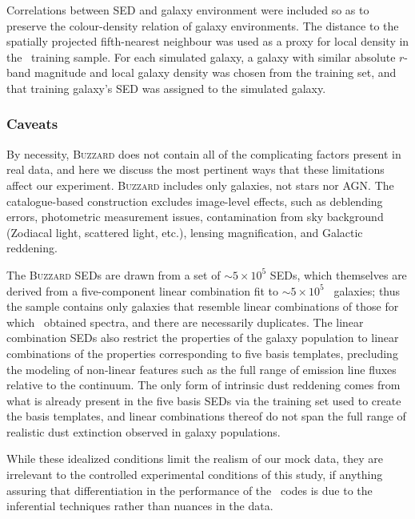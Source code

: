 Correlations between SED and galaxy environment were included so as to preserve the colour-density relation of galaxy environments.
The distance to the spatially projected fifth-nearest neighbour was used as a proxy for local density in the \sdss\ training sample.
For each simulated galaxy, a galaxy with similar absolute $r$-band magnitude and local galaxy density was chosen from the training set, and that training galaxy's SED was assigned to the simulated galaxy.

\subsubsection{Caveats}

By necessity, \textsc{Buzzard} does not contain all of the complicating factors present in real data, and here we discuss the most pertinent ways that these limitations affect our experiment.
\textsc{Buzzard} includes only galaxies, not stars nor AGN.
The catalogue-based construction excludes image-level effects, such as deblending errors, photometric measurement issues, contamination from sky background (Zodiacal light, scattered light, etc.), lensing magnification, and Galactic reddening.

The \textsc{Buzzard} SEDs are drawn from a set of $\sim 5 \times 10^{5}$ SEDs, which themselves are derived from a five-component linear combination fit to $\sim 5 \times 10^{5}$ \sdss\ galaxies; thus the sample contains only galaxies that resemble linear combinations of those for which \sdss\ obtained spectra, and there are necessarily duplicates.
The linear combination SEDs also restrict the properties of the galaxy population to linear combinations of the properties corresponding to five basis templates, precluding the modeling of non-linear features such as the full range of emission line fluxes relative to the continuum.
The only form of intrinsic dust reddening comes from what is already present in the five basis SEDs via the training set used to create the basis templates, and linear combinations thereof do not span the full range of realistic dust extinction observed in galaxy populations.

While these idealized conditions limit the realism of our mock data, they are irrelevant to the controlled experimental conditions of this study, if anything assuring that differentiation in the performance of the \pzpdf\ codes is due to the inferential techniques rather than nuances in the data.

